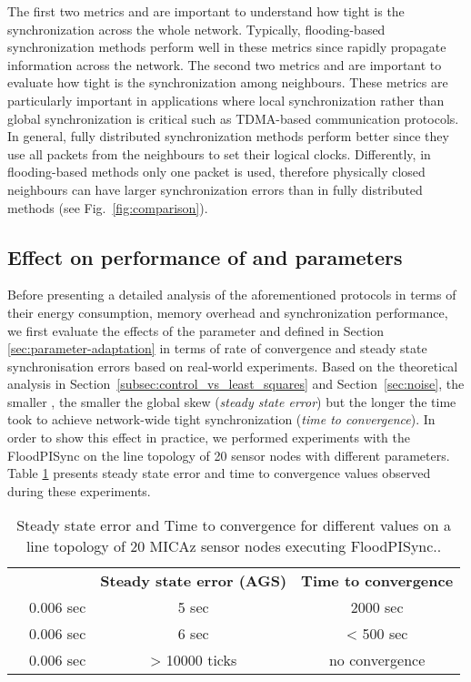 \documentclass[english,a4paper,10pt,final]{article}
\numberwithin{equation}{section}
\numberwithin{figure}{section}
\begin{document}
The first two metrics  and  are important to understand how tight is the synchronization across the whole network. Typically, flooding-based synchronization methods perform well in these metrics since rapidly propagate information across the network. The second two metrics  and  are important to evaluate how tight is the synchronization among neighbours. These metrics are particularly important in applications where local synchronization rather than global synchronization is critical such as TDMA-based communication protocols. In general, fully distributed synchronization  methods perform better since they use all packets from the neighbours to set their logical clocks. Differently, in flooding-based methods only one packet is used, therefore physically closed neighbours can have larger synchronization errors than in fully distributed methods (see Fig.~\ref{fig:comparison}).


\subsection{ Effect on performance of   and  parameters}
\label{sec:eval-alpha}
Before presenting a detailed analysis of the aforementioned protocols in terms of their energy consumption, memory overhead and synchronization performance, we first evaluate the effects of the parameter   and  defined in Section \ref{sec:parameter-adaptation} in terms of rate of convergence and steady state synchronisation errors based on real-world experiments. Based on the theoretical analysis in Section~\ref{subsec:control_vs_least_squares} and Section~\ref{sec:noise}, the smaller  , the smaller the global skew (\textit{steady state error}) but the longer the time took to achieve network-wide tight synchronization (\textit{time to convergence}). In order to show this effect in practice, we performed experiments with the FloodPISync on the line topology of 20 sensor nodes with different   parameters. Table \ref{tab:alpha} presents steady state error and time to convergence values observed during these experiments. 

\begin{table}
\center
\caption{Steady state error and Time to convergence for different  values on a line topology of 20 MICAz sensor nodes executing FloodPISync.\label{tab:alpha}.}

\begin{tabular}{cccc}
 &  & \textbf{Steady state error (AGS)} & \textbf{Time to convergence} \\
   & 0.006 sec &  5 sec &  2000 sec\\ 
   & 0.006 sec &  6 sec & < 500 sec \\ 
   & 0.006 sec &  > 10000 ticks & no convergence \\ 
\end{tabular}

\end{table}
\end{document}
